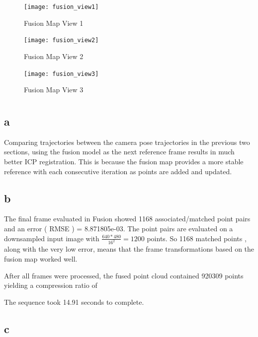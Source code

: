 \documentclass[12pt]{article}
\begin{document}
\begin{figure}[H]
\centering
\texttt{[image: fusion\_view1]}
\caption{ Fusion Map View 1 } 
\label{fig:fusion1}
\end{figure}   

\begin{figure}[H]
\centering
\texttt{[image: fusion\_view2]}
\caption{ Fusion Map View 2 } 
\label{fig:fusion2}
\end{figure}   

\begin{figure}[H]
\centering
\texttt{[image: fusion\_view3]}
\caption{ Fusion Map View 3 } 
\label{fig:fusion3}
\end{figure}   

\section{}
\subsection{a}
Comparing trajectories between the camera pose trajectories in the previous two sections, using the fusion model as the next reference frame results in much better ICP registration. This is because the fusion map provides a more stable reference with each consecutive iteration as points are added and updated.

\subsection{b}
The final frame evaluated in Fusion showed 1168 associated/matched point pairs and an error ( RMSE ) = 8.871805e-03.  
The point pairs are evaluated on a downsampled input image with $\frac{  640 * 480 } { 16^{2} } = 1200$ points. So 1168 matched points , along with the very low error, means that the frame transformations based on the fusion map worked well.
  
After all frames were processed, the fused point cloud contained 920309 points yielding a compression ratio of  %
  
The sequence took 14.91 seconds to complete.  

\subsection{c}
\end{document}
